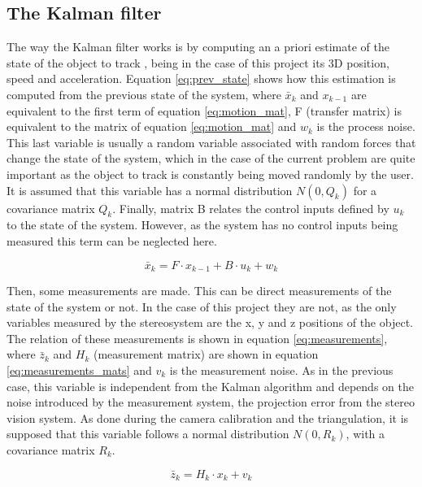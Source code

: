 \subsection{The Kalman filter}
The way the Kalman filter works is by computing an a priori estimate of the state of the object to track \cite{OReilly}, being in the case of this project its 3D position, speed and acceleration. Equation \eqref{eq:prev_state} shows how this estimation is computed from the previous state of the system, where $\bar{x}_{k}$ and $x_{k-1}$ are equivalent to the first term of equation \eqref{eq:motion_mat}, F (transfer matrix) is equivalent to the matrix of equation \eqref{eq:motion_mat} and $w_{k}$ is the process noise.
This last variable is usually a random variable associated with random forces that change the state of the system, which in the case of the current problem are quite important as the object to track is constantly being moved randomly by the user.
It is assumed that this variable has a normal distribution $N(0,Q_{k})$ for a covariance matrix $Q_{k}$.
Finally, matrix B relates the control inputs defined by $u_{k}$ to the state of the system. However, as the system has no control inputs being measured this term can be neglected here.

\begin{equation}
\bar{x}_{k}=F \cdot x_{k-1}+B \cdot u_{k}+w_{k}
\label{eq:prev_state}
\end{equation}

Then, some measurements are made. This can be direct measurements of the state of the system or not.
In the case of this project they are not, as the only variables measured by the stereosystem are the x, y and z positions of the object.
The relation of these measurements is shown in equation \eqref{eq:measurements}, where $\bar{z}_{k}$ and $H_{k}$ (measurement matrix) are shown in equation \eqref{eq:measurements_mats} and $v_{k}$ is the measurement noise.
As in the previous case, this variable is independent from the Kalman algorithm and depends on the noise introduced by the measurement system, the projection error from the stereo vision system.
As done during the camera calibration and the triangulation, it is  supposed that this variable follows a normal distribution $N(0,R_{k})$, with a covariance matrix $R_{k}$.

\begin{equation}
\bar{z}_{k}=H_{k} \cdot x_{k}+v_{k}
\label{eq:measurements}
\end{equation}

